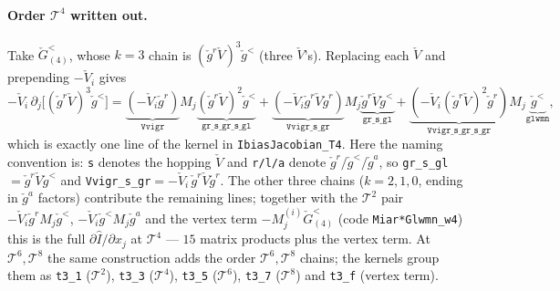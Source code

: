 \documentclass[11pt,a4paper]{article}
\begin{document}
\paragraph{Order $\mathcal T^4$ written out.}
Take $\check G^<_{(4)}$, whose $k=3$ chain is $(\check g^r\check V)^3\check g^<$
(three $\check V$'s).  Replacing each $\check V$ and prepending $-\check V_i$ gives
\begin{equation}
  -\check V_i\,\partial_j\!\big[(\check g^r\check V)^3\check g^<\big]
  = \underbrace{(-\check V_i\check g^r)}_{\texttt{Vvigr}}M_j\underbrace{(\check g^r\check V)^2\check g^<}_{\texttt{gr\_s\_gr\_s\_gl}}
  + \underbrace{(-\check V_i\check g^r\check V\check g^r)}_{\texttt{Vvigr\_s\_gr}}M_j\underbrace{\check g^r\check V\check g^<}_{\texttt{gr\_s\_gl}}
  + \underbrace{(-\check V_i(\check g^r\check V)^2\check g^r)}_{\texttt{Vvigr\_s\_gr\_s\_gr}}M_j\underbrace{\check g^<}_{\texttt{glwmn}} ,
  \label{eq:T4_k3}
\end{equation}
which is exactly one line of the kernel in \texttt{IbiasJacobian\_T4}.  Here the
naming convention is: \texttt{s} denotes the hopping $\check V$ and
\texttt{r/l/a} denote $\check g^r/\check g^</\check g^a$, so
\texttt{gr\_s\_gl}$=\check g^r\check V\check g^<$ and
\texttt{Vvigr\_s\_gr}$=-\check V_i\,\check g^r\check V\check g^r$.  The other three
chains ($k=2,1,0$, ending in $\check g^a$ factors) contribute the remaining
lines; together with the $\mathcal T^2$ pair $-\check V_i\check g^r M_j\check g^<$,
$-\check V_i\check g^< M_j\check g^a$ and the vertex term $-M^{(i)}_j\check
G^<_{(4)}$ (code \texttt{Miar*Glwmn\_w4}) this is the full
$\partial\hat I/\partial x_j$ at $\mathcal T^4$ --- $15$ matrix products plus the
vertex term.  At $\mathcal T^6,\mathcal T^8$ the same construction adds the order
$\mathcal T^6,\mathcal T^8$ chains; the kernels group them as
\verb|t3_1| ($\mathcal T^2$), \verb|t3_3| ($\mathcal T^4$), \verb|t3_5| ($\mathcal
T^6$), \verb|t3_7| ($\mathcal T^8$) and \verb|t3_f| (vertex term).
\end{document}
